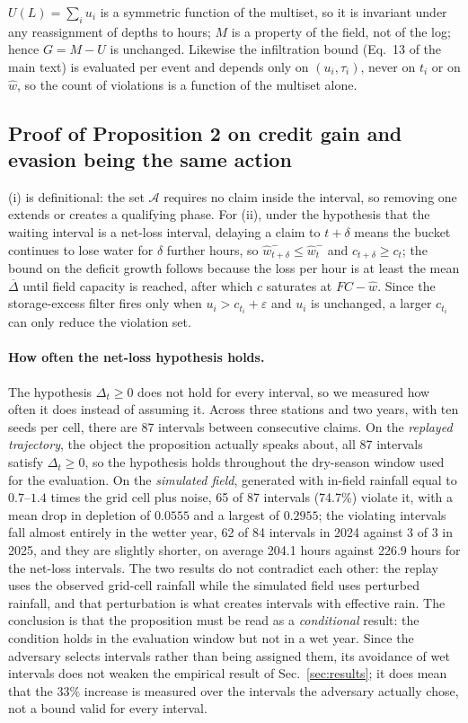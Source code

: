 $U(L)=\sum_i u_i$ is a symmetric function of the multiset, so it is invariant
under any reassignment of depths to hours; $M$ is a property of the field, not
of the log; hence $G=M-U$ is unchanged. Likewise the infiltration bound (Eq.~13
of the main text) is evaluated per event and depends only on $(u_i,\tau_i)$,
never on $t_i$ or on $\hat w$, so the count of violations is a function of the
multiset alone.

\subsection*{Proof of Proposition 2 on credit gain and evasion being the same action}

(i) is definitional: the set $\mathcal{A}$ requires no claim inside the
interval, so removing one extends or creates a qualifying phase. For (ii), under the
hypothesis that the waiting interval is a net-loss interval, delaying a claim to
$t+\delta$ means the bucket continues to lose water for $\delta$ further
hours, so $\hat w_{t+\delta}^{-}\le\hat w_t^{-}$ and
$c_{t+\delta}\ge c_t$; the bound on the deficit growth follows because the
loss per hour is at least the mean $\overline{\Delta}$ until field capacity
is reached, after which $c$ saturates at $FC-\hat w$. Since the storage-excess
filter fires only when $u_i>c_{t_i}+\varepsilon$ and $u_i$ is unchanged, a larger
$c_{t_i}$ can only reduce the violation set.

\paragraph*{How often the net-loss hypothesis holds.}
The hypothesis $\Delta_t\ge0$ does not hold for every interval, so we measured
how often it does instead of assuming it. Across three stations and two years, with
ten seeds per cell, there are 87 intervals between consecutive claims. On the
\emph{replayed trajectory}, the object the proposition actually speaks about, all
87 intervals satisfy $\Delta_t\ge0$, so the hypothesis holds throughout
the dry-season window used for the evaluation. On the \emph{simulated field}, generated
with in-field rainfall equal to $0.7$--$1.4$ times the grid cell plus noise,
65 of 87 intervals (74.7\%) violate it, with a mean drop in
depletion of $0.0555$ and a largest of $0.2955$; the violating
intervals fall almost entirely in the wetter year, 62 of 84 intervals in
2024 against 3 of 3 in 2025, and they are slightly shorter, on average
204.1 hours against 226.9 hours for the net-loss intervals. The two
results do not contradict each other: the replay uses the observed grid-cell rainfall
while the simulated field uses perturbed rainfall, and that perturbation is what
creates intervals with effective rain. The conclusion is that the proposition must be
read as a \emph{conditional} result: the condition holds in the evaluation window but
not in a wet year. Since the adversary selects intervals rather than being assigned
them, its avoidance of wet intervals does not weaken the empirical result of
Sec.~\ref{sec:results}; it does mean that the $33\%$ increase is measured over
the intervals the adversary actually chose, not a bound valid for every interval.

